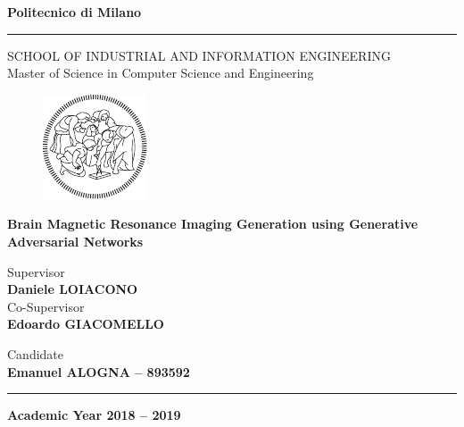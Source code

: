 \documentclass[a4paper,12pt,openright,notitlepage,twoside]{book}
\begin{document}
\thispagestyle{empty} %

\begin{center}
\Large{\textbf{Politecnico di Milano}} \\
\vspace{-2mm}
\rule{\textwidth}{0.4pt}
\normalsize{SCHOOL OF INDUSTRIAL AND INFORMATION ENGINEERING} \\
\normalsize{Master of Science in Computer Science and Engineering} \\
\vspace{20mm}
\begin{figure}[h!]
\centering
\includegraphics[height=0.20\textheight]{images/logo_poli_bianco}
\end{figure}
\vspace{12mm}
\huge{\textbf{Brain Magnetic Resonance Imaging Generation using Generative Adversarial Networks}} \\
\vspace{22mm}
\end{center}

\begin{flushleft}
\normalsize{Supervisor} \\
\small{\textbf{Daniele LOIACONO}} \\
\vspace{5mm}
\normalsize{Co-Supervisor} \\
\small{\textbf{Edoardo GIACOMELLO}} \\
\end{flushleft}
\vspace{10mm}

\begin{flushright}
\normalsize{Candidate} \\
\small{\textbf{Emanuel ALOGNA -- 893592}} \\
\end{flushright}
\vspace{15mm}

\begin{center}
\rule{\textwidth}{0.4pt}
\small{\textbf{Academic Year 2018 -- 2019}}
\end{center}
\end{document}
